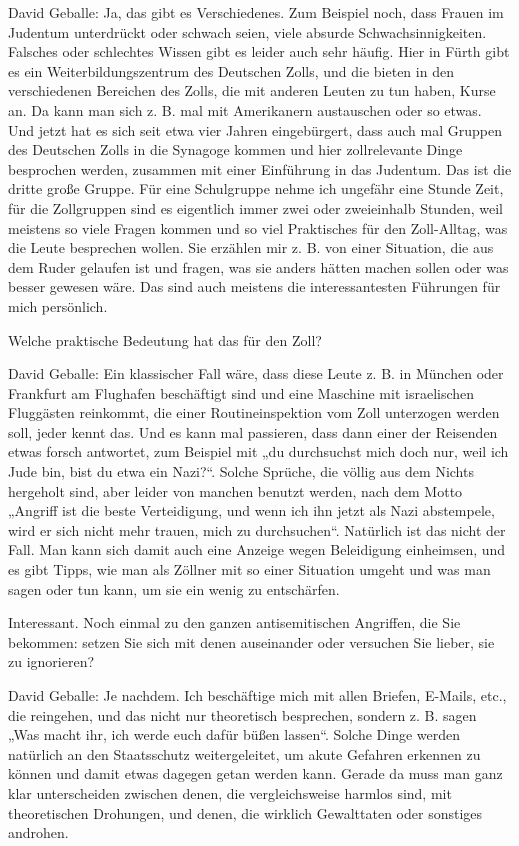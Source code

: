 David Geballe: Ja, das gibt es Verschiedenes. Zum Beispiel noch, dass Frauen im Judentum unterdrückt oder schwach seien, viele absurde Schwachsinnigkeiten. Falsches oder schlechtes Wissen gibt es leider auch sehr häufig. Hier in Fürth gibt es ein Weiterbildungszentrum des Deutschen Zolls, und die bieten in den verschiedenen Bereichen des Zolls, die mit anderen Leuten zu tun haben, Kurse an. Da kann man sich z. B. mal mit Amerikanern austauschen oder so etwas. Und jetzt hat es sich seit etwa vier Jahren eingebürgert, dass auch mal Gruppen des Deutschen Zolls in die Synagoge kommen und hier zollrelevante Dinge besprochen werden, zusammen mit einer Einführung in das Judentum. Das ist die dritte große Gruppe. Für eine Schulgruppe nehme ich ungefähr eine Stunde Zeit, für die Zollgruppen sind es eigentlich immer zwei oder zweieinhalb Stunden, weil meistens so viele Fragen kommen und so viel Praktisches für den Zoll-Alltag, was die Leute besprechen wollen. Sie erzählen mir z. B. von einer Situation, die aus dem Ruder gelaufen ist und fragen, was sie anders hätten machen sollen oder was besser gewesen wäre. Das sind auch meistens die interessantesten Führungen für mich persönlich. 

 Welche praktische Bedeutung hat das für den Zoll? 

David Geballe: Ein klassischer Fall wäre, dass diese Leute z. B. in München oder Frankfurt am Flughafen beschäftigt sind und eine Maschine mit israelischen Fluggästen reinkommt, die einer Routineinspektion vom Zoll unterzogen werden soll, jeder kennt das. Und es kann mal passieren, dass dann einer der Reisenden etwas forsch antwortet, zum Beispiel mit „du durchsuchst mich doch nur, weil ich Jude bin, bist du etwa ein Nazi?“. Solche Sprüche, die völlig aus dem Nichts hergeholt sind, aber leider von manchen benutzt werden, nach dem Motto „Angriff ist die beste Verteidigung, und wenn ich ihn jetzt als Nazi abstempele, wird er sich nicht mehr trauen, mich zu durchsuchen“. Natürlich ist das nicht der Fall. Man kann sich damit auch eine Anzeige wegen Beleidigung einheimsen, und es gibt Tipps, wie man als Zöllner mit so einer Situation umgeht und was man sagen oder tun kann, um sie ein wenig zu entschärfen. 

 Interessant. Noch einmal zu den ganzen antisemitischen Angriffen, die Sie bekommen: setzen Sie sich mit denen auseinander oder versuchen Sie lieber, sie zu ignorieren? 

David Geballe: Je nachdem. Ich beschäftige mich mit allen Briefen, E-Mails, etc., die reingehen, und das nicht nur theoretisch besprechen, sondern z. B. sagen „Was macht ihr, ich werde euch dafür büßen lassen“. Solche Dinge werden natürlich an den Staatsschutz weitergeleitet, um akute Gefahren erkennen zu können und damit etwas dagegen getan werden kann. Gerade da muss man ganz klar unterscheiden zwischen denen, die vergleichsweise harmlos sind, mit theoretischen Drohungen, und denen, die wirklich Gewalttaten oder sonstiges androhen. 

